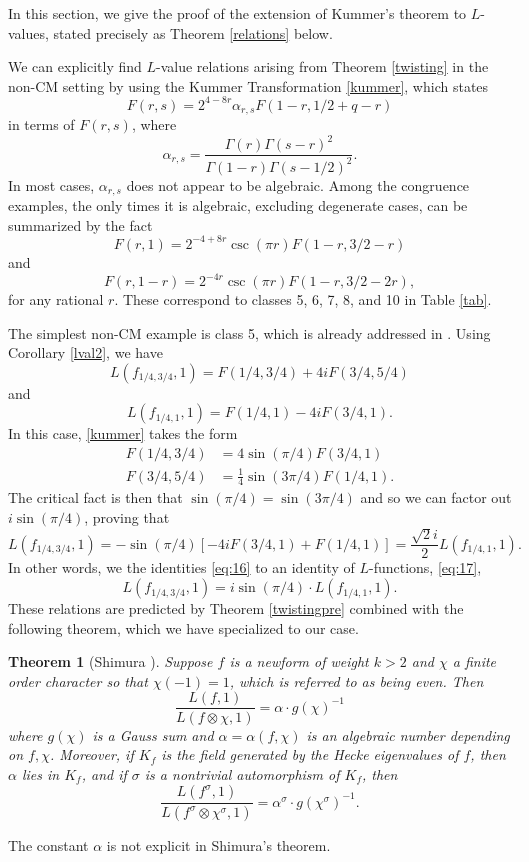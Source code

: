 \documentclass[12pt]{amsart}
\newtheorem{theorem}{Theorem}[section]
\theoremstyle{definition}
\theoremstyle{remark}
\begin{document}
In this section, we give the proof of the extension of Kummer's theorem to $L$-values, stated precisely as Theorem \ref{relations} below. 


We can explicitly find $L$-value relations arising from Theorem \ref{twisting} in the non-CM setting by using the Kummer Transformation \eqref{kummer}, which states  
$$F(r,s)=2^{4-8r}\alpha_{r,s}F(1-r,1/2+q-r)$$  in terms of $F(r,s)$, where \begin{equation}\label{crs}
    \alpha_{r,s}=\frac{\Gamma(r) \Gamma(s - r)^2}{\Gamma(1 - r) \Gamma(s-1/2)^2 }. 
\end{equation} In most cases, $\alpha_{r,s}$ does not appear to be algebraic. Among the congruence examples, the only times it is algebraic, excluding degenerate cases, can be summarized by the fact $$F(r,1)=2^{-4+8r}\csc(\pi r)F(1-r,3/2-r)$$ and $$F(r,1-r)=2^{-4 r} \csc(\pi r)F(1-r,3/2-2r),$$ for any rational $r$.
These correspond to classes 5, 6, 7, 8, and 10 in Table \ref{tab}.

The simplest non-CM example is class 5, which is already addressed in \cite{aglt}. Using Corollary \ref{lval2}, we have $$L(f_{1/4,3/4},1)=F(1/4,3/4)+4iF(3/4,5/4)$$ and $$L(f_{1/4,1},1)=F(1/4,1)-4iF(3/4,1).$$ In this case, \eqref{kummer} takes the form 
\begin{equation}\label{eq:16}
\begin{split}
    F(1/4,3/4)&=4\sin(\pi/4)F(3/4,1)\\ F(3/4,5/4)&=\frac{1}{4}\sin(3\pi/4)F(1/4,1).   
\end{split}
\end{equation}  The critical fact is then that $\sin(\pi/4)=\sin(3\pi/4)$ and so we can factor out $i\sin(\pi/4)$,
proving that \begin{equation}\label{eq:17}
    L(f_{1/4,3/4},1)=-\sin(\pi/4)[-4iF(3/4,1)+F(1/4,1)]=\frac{\sqrt{2}i}{2}L( f_{1/4,1},1).
\end{equation}  In other words, we  the identities  \eqref{eq:16} to an identity of $L$-functions, \eqref{eq:17}, $$L(f_{1/4,3/4},1)=i\sin(\pi/4)\cdot L(f_{1/4,1},1).$$ These relations are predicted by Theorem \ref{twistingpre} combined with the following theorem, which we have specialized to our case. \begin{theorem}[Shimura \cite{shimurazeta}]\label{shimura}
 Suppose $f$ is a newform of weight $k>2$ and $\chi$ a finite order character so that $\chi(-1)=1$,  which is referred to as being even.  Then $$\frac{L(f,1)}{L(f\otimes \chi,1)}=\alpha\cdot  g(\chi)^{-1}$$ where $g(\chi)$ is a Gauss sum and $\alpha=\alpha(f,\chi)$ is an algebraic number depending on $f,\chi$. Moreover, if $K_f$  is the field generated by the Hecke eigenvalues of $f$, then $\alpha$ lies in $K_f$, and if $\sigma$ is a nontrivial automorphism of $K_f$, then $$\frac{L(f^\sigma,1)}{ L(f^\sigma\otimes \chi^\sigma,1)}=\alpha^\sigma\cdot  g(\chi^\sigma)^{-1}.$$
\end{theorem}
The constant $\alpha$ is not explicit in Shimura's theorem.
\end{document}
